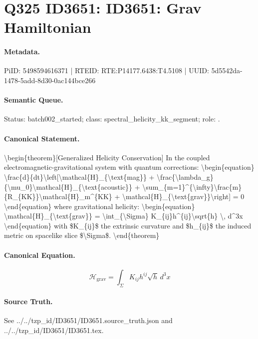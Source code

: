 \section*{Q325 ID3651: ID3651: Grav Hamiltonian}
\paragraph{Metadata.}
PiID: 5498594616371 | RTEID: RTE:P14177.6438:T4.5108 | UUID: 5d5542da-1478-5add-8d30-0ac144bce266

\paragraph{Semantic Queue.}
Status: batch002\_started; class: spectral\_helicity\_kk\_segment; role: .

\paragraph{Canonical Statement.}
\textbackslash{}begin\{theorem\}[Generalized Helicity Conservation] In the coupled electromagnetic-gravitational system with quantum corrections: \textbackslash{}begin\{equation\} \textbackslash{}frac\{d\}\{dt\}\textbackslash{}left[\textbackslash{}mathcal\{H\}\_\{\textbackslash{}text\{mag\}\} + \textbackslash{}frac\{\textbackslash{}lambda\_g\}\{\textbackslash{}mu\_0\}\textbackslash{}mathcal\{H\}\_\{\textbackslash{}text\{acoustic\}\} + \textbackslash{}sum\_\{m=1\}\textasciicircum{}\{\textbackslash{}infty\}\textbackslash{}frac\{m\}\{R\_\{KK\}\}\textbackslash{}mathcal\{H\}\_m\textasciicircum{}\{KK\} + \textbackslash{}mathcal\{H\}\_\{\textbackslash{}text\{grav\}\}\textbackslash{}right] = 0 \textbackslash{}end\{equation\} where gravitational helicity: \textbackslash{}begin\{equation\} \textbackslash{}mathcal\{H\}\_\{\textbackslash{}text\{grav\}\} = \textbackslash{}int\_\{\textbackslash{}Sigma\} K\_\{ij\}h\textasciicircum{}\{ij\}\textbackslash{}sqrt\{h\} \textbackslash{}, d\textasciicircum{}3x \textbackslash{}end\{equation\} with \$K\_\{ij\}\$ the extrinsic curvature and \$h\_\{ij\}\$ the induced metric on spacelike slice \$\textbackslash{}Sigma\$. \textbackslash{}end\{theorem\}

\paragraph{Canonical Equation.}
\[
\begin{equation} \mathcal{H}_{\text{grav}} = \int_{\Sigma} K_{ij}h^{ij}\sqrt{h} \, d^3x \end{equation}
\]

\paragraph{Source Truth.}
See ../../tzp\_id/ID3651/ID3651.source\_truth.json and ../../tzp\_id/ID3651/ID3651.tex.
